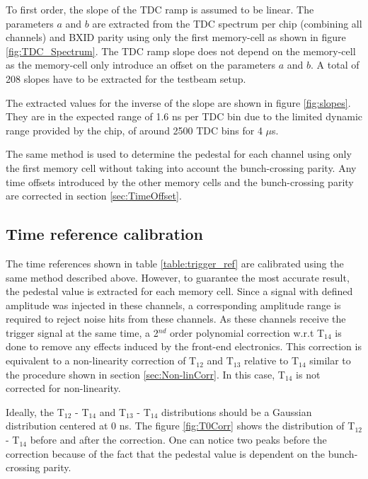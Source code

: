\documentclass{JINST}
\begin{document}
To first order, the slope of the TDC ramp is assumed to be linear. The parameters $a$ and $b$ are extracted from the TDC spectrum per chip (combining all channels) and BXID parity using only the first memory-cell as shown in figure \ref{fig:TDC_Spectrum}. The TDC ramp slope does not depend on the memory-cell as the memory-cell only introduce an offset on the parameters $a$ and $b$. A total of 208 slopes have to be extracted for the testbeam setup.

The extracted values for the inverse of the slope are shown in figure \ref{fig:slopes}. They are in the expected range of 1.6 ns per TDC bin due to the limited dynamic range provided by the chip, of around 2500 TDC bins for 4 $\mu$s.

The same method is used to determine the pedestal for each channel using only the first memory cell without taking into account the bunch-crossing parity. Any time offsets introduced by the other memory cells and the bunch-crossing parity are corrected in section \ref{sec:TimeOffset}.

\subsection{Time reference calibration}

The time references shown in table \ref{table:trigger_ref} are calibrated using the same method described above. However, to guarantee the most accurate result, the pedestal value is extracted for each memory cell. Since a signal with defined amplitude was injected in these channels, a corresponding amplitude range is required to reject noise hits from these channels. As these channels receive the trigger signal at the same time, a 2$^{nd}$ order polynomial correction w.r.t T$_{14}$ is done to remove any effects induced by the front-end electronics. This correction is equivalent to a non-linearity correction of T$_{12}$ and T$_{13}$ relative to T$_{14}$ similar to the procedure shown in section \ref{sec:Non-linCorr}. In this case, T$_{14}$ is not corrected for non-linearity.

Ideally, the T$_{12}$ - T$_{14}$ and T$_{13}$ - T$_{14}$ distributions should be a Gaussian distribution centered at 0 ns. The figure \ref{fig:T0Corr} shows the distribution of T$_{12}$ - T$_{14}$ before and after the correction. One can notice two peaks before the correction because of the fact that the pedestal value is dependent on the bunch-crossing parity.
\end{document}
